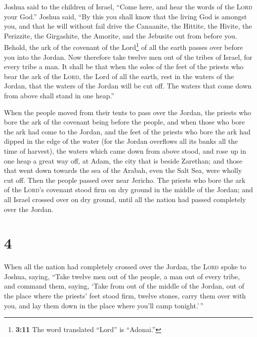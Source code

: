  Joshua said to the children of Israel, ``Come here, and
hear the words of the \textsc{Lord} your God.''  Joshua
said, ``By this you shall know that the living God is amongst you, and
that he will without fail drive the Canaanite, the Hittite, the Hivite,
the Perizzite, the Girgashite, the Amorite, and the Jebusite out from
before you.  Behold, the ark of the covenant of the
Lord\footnote{\textbf{3:11} The word translated ``Lord'' is ``Adonai.''}
of all the earth passes over before you into the Jordan. 
Now therefore take twelve men out of the tribes of Israel, for every
tribe a man.  It shall be that when the soles of the feet
of the priests who bear the ark of the \textsc{Lord}, the Lord of all
the earth, rest in the waters of the Jordan, that the waters of the
Jordan will be cut off. The waters that come down from above shall stand
in one heap.''

 When the people moved from their tents to pass over the
Jordan, the priests who bore the ark of the covenant being before the
people,  and when those who bore the ark had come to the
Jordan, and the feet of the priests who bore the ark had dipped in the
edge of the water (for the Jordan overflows all its banks all the time
of harvest),  the waters which came down from above
stood, and rose up in one heap a great way off, at Adam, the city that
is beside Zarethan; and those that went down towards the sea of the
Arabah, even the Salt Sea, were wholly cut off. Then the people passed
over near Jericho.  The priests who bore the ark of the
\textsc{Lord}'s covenant stood firm on dry ground in the middle of the
Jordan; and all Israel crossed over on dry ground, until all the nation
had passed completely over the Jordan.

\hypertarget{section-3}{%
\section{4}\label{section-3}}

 When all the nation had completely crossed over the
Jordan, the \textsc{Lord} spoke to Joshua, saying,  ``Take
twelve men out of the people, a man out of every tribe, 
and command them, saying, `Take from out of the middle of the Jordan,
out of the place where the priests' feet stood firm, twelve stones,
carry them over with you, and lay them down in the place where you'll
camp tonight.'\,''

